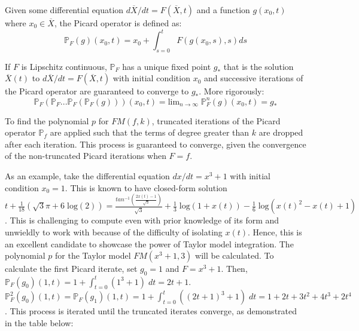 Given some differential equation $d\overline{X} / dt = F(\overline{X}, t)$ and a function $g(x_0, t)$ where $x_0 \in \overline{X}$, the Picard operator is defined as: 
\[ \mathbb{P}_F(g)(x_0, t) = x_0 + \int^t_{s=0} F(g(x_0, s), s) ds \]

If $F$ is Lipschitz continuous, $\mathbb{P}_F$ has a unique fixed point $g_*$ that is the solution $\overline{X}(t)$ to $d\overline{X} / dt = F(\overline{X}, t)$ with initial condition $x_0$ and successive iterations of the Picard operator are guaranteed to converge to $g_*$. More rigorously: 
\[ \mathbb{P}_F(\mathbb{P}_F...\mathbb{P}_F(\mathbb{P}_F(g)))(x_0, t) = \text{lim}_{n \rightarrow \infty} \; \mathbb{P}_F^n(g)(x_0, t) = g_* \]

To find the polynomial $p$ for $FM(f,k)$, truncated iterations of the Picard operator $\mathbb{P}_f$ are applied such that the terms of degree greater than $k$ are dropped after each iteration. This process is guaranteed to converge, given the convergence of the non-truncated Picard iterations when $F = f$.

As an example, take the differential equation $dx/dt = x^3 + 1$ with initial condition $x_0 = 1$. This is known to have closed-form solution $t + \frac{1}{18} (\sqrt{3} \pi + 6 \; \text{log}(2)) = \frac{tan^{-1}( \frac{2 x(t) - 1} {\sqrt{3}} )} {\sqrt{3}} + \frac{1}{3} \; \text{log}(1 + x(t)) - \frac{1}{6} \; \text{log}(x(t)^2 - x(t) + 1)$. This is challenging to compute even with prior knowledge of its form and unwieldly to work with because of the difficulty of isolating $x(t)$. Hence, this is an excellent candidate to showcase the power of Taylor model integration. The polynomial $p$ for the Taylor model $FM(x^3 + 1, 3)$ will be calculated. To calculate the first Picard iterate, set $g_0 = 1$ and $F = x^3 + 1$. Then, $\mathbb{P}_F(g_0)(1, t) = 1 + \int^t_{t=0} (1^3 + 1) \; dt = 2t + 1$. $\mathbb{P}_F^2(g_0)(1, t) = \mathbb{P}_F(g_1)(1, t) = 1 + \int^t_{t=0} ((2t + 1)^3 + 1) \; dt = 1 + 2 t + 3 t^2 + 4 t^3 + 2 t^4$. This process is iterated until the truncated iterates converge, as demonstrated in the table below:

